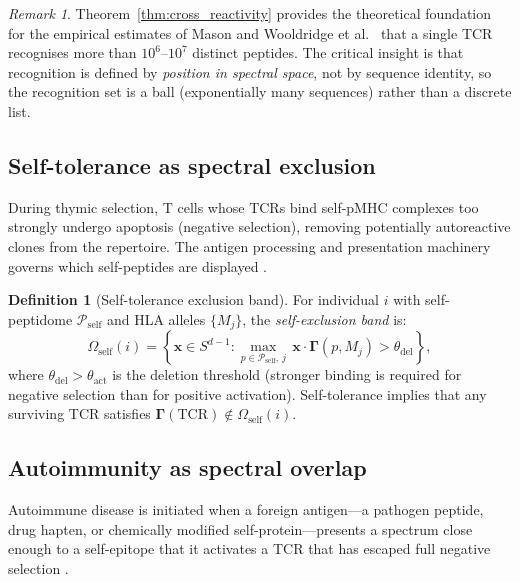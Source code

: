 \documentclass[twocolumn,11pt,a4paper]{article}
\theoremstyle{definition}
\newtheorem{definition}[theorem]{Definition}
\theoremstyle{remark}
\newtheorem{remark}[theorem]{Remark}
\begin{document}
\begin{remark}
Theorem~\ref{thm:cross_reactivity} provides the theoretical foundation for
the empirical estimates of Mason \citep{mason1998} and Wooldridge et al.\
\citep{wooldridge2012} that a single TCR recognises more than $10^6$--$10^7$
distinct peptides. The critical insight is that recognition is defined by
\emph{position in spectral space}, not by sequence identity, so the recognition
set is a ball (exponentially many sequences) rather than a discrete list.
\end{remark}

\subsection{Self-tolerance as spectral exclusion}
\label{sec:self_tolerance}

During thymic selection, T cells whose TCRs bind self-pMHC complexes too
strongly undergo apoptosis (negative selection), removing potentially
autoreactive clones from the repertoire. The antigen processing and
presentation machinery governs which self-peptides are displayed
\citep{rock1994,neefjes2011}.

\begin{definition}[Self-tolerance exclusion band]
\label{def:self_tolerance}
For individual $i$ with self-peptidome $\mathcal{P}_{\mathrm{self}}$ and HLA
alleles $\{M_j\}$, the \emph{self-exclusion band} is:
\begin{equation}
  \Omega_{\mathrm{self}}(i)
  = \left\{ \mathbf{x} \in S^{d-1} :
    \max_{p \in \mathcal{P}_{\mathrm{self}},\, j}\,
    \mathbf{x}\cdot\bm{\Gamma}(p,M_j) > \theta_{\mathrm{del}} \right\},
  \label{eq:self_exclusion}
\end{equation}
where $\theta_{\mathrm{del}} > \theta_{\mathrm{act}}$ is the deletion
threshold (stronger binding is required for negative selection than for
positive activation). Self-tolerance implies that any surviving TCR satisfies
$\bm{\Gamma}(\mathrm{TCR}) \notin \Omega_{\mathrm{self}}(i)$.
\end{definition}

\subsection{Autoimmunity as spectral overlap}
\label{sec:autoimmunity}

Autoimmune disease is initiated when a foreign antigen---a pathogen peptide,
drug hapten, or chemically modified self-protein---presents a spectrum close
enough to a self-epitope that it activates a TCR that has escaped full
negative selection \citep{wucherpfennig1995}.
\end{document}
